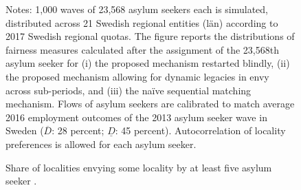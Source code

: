 \documentclass[12pt,fleqn]{article}
\begin{document}
\begin{figure}
	\caption{Share of localities envying some locality by at least five asylum seeker \label{FIG:quotas_fair1}.}
	\begin{center}
	\end{center}
		{\scriptsize \vspace{-1em}
	\begin{singlespace}
		{\sc Notes:} 1,000 waves of 23,568 asylum seekers each is simulated, distributed across 21 Swedish regional entities (l\"{a}n) according to 2017 Swedish regional quotas. The figure reports the distributions of fairness measures calculated after the assignment of the 23,568th asylum seeker for (i) the proposed mechanism restarted blindly, (ii) the proposed mechanism allowing for dynamic legacies in envy across sub-periods, and (iii) the na\"{i}ve sequential matching mechanism. Flows of asylum seekers are calibrated to match average 2016 employment outcomes of the 2013 asylum seeker wave in Sweden ($\overline{D}$: 28 percent; $\underline{D}$: 45 percent). Autocorrelation of locality preferences is allowed for each asylum seeker.
	\end{singlespace}
	 }
\end{figure}
\end{document}
